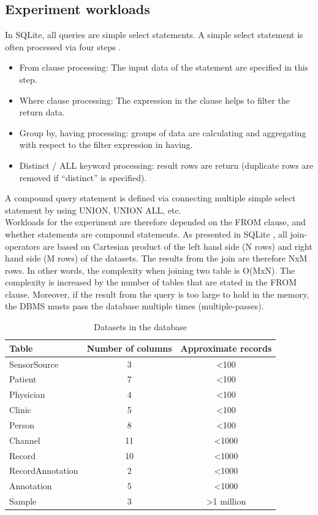 \subsection{Experiment workloads}
In SQLite, all queries are simple select statements. A simple select statement is often processed via four steps \citep{SQLITE_SELECT}.
\begin{itemize}
\item From clause processing: The input data of the statement are specified in this step.
\item Where clause processing: The expression in the clause helps to filter the return data.
\item Group by, having processing: groups of data are calculating and aggregating with respect to the filter expression in having.
\item Distinct / ALL keyword processing: result rows are return (duplicate rows are removed if “distinct” is specified).
\end{itemize}
A compound query statement is defined via connecting multiple simple select statement by using UNION, UNION ALL, etc.\\
Workloads for the experiment are therefore depended on the FROM clause, and whether statements are compound statements. As presented in SQLite \citep{SQLITE_SELECT}, all join-operators are based on Cartesian product of the left hand side (N rows) and right hand side (M rows) of the datasets. The results from the join are therefore NxM rows. In other words, the complexity when joining two table is O(MxN). The complexity is increased by the number of tables that are stated in the FROM clause. Moreover, if the result from the query is too large to hold in the memory, the DBMS musts pass the database multiple times (multiple-passes).\\
\begin{table}
\centering
\begin{tabular}{|l|c|c|}
\hline
\cellcolor[HTML]{00D2CB}Table & \cellcolor[HTML]{00D2CB}Number of columns & \cellcolor[HTML]{00D2CB}Approximate records \\ \hline
\cellcolor[HTML]{00D2CB}SensorSource & 3 & \textless100 \\ \hline
\cellcolor[HTML]{00D2CB}Patient & 7 & \textless100 \\ \hline
\cellcolor[HTML]{00D2CB}Physician & 4 & \textless100 \\ \hline
\cellcolor[HTML]{00D2CB}Clinic & 5 & \textless100 \\ \hline
\cellcolor[HTML]{00D2CB}Person & 8 & \textless100 \\ \hline
\cellcolor[HTML]{00D2CB}Channel & 11 & \textless1000 \\ \hline
\cellcolor[HTML]{00D2CB}Record & 10 & \textless1000 \\ \hline
\cellcolor[HTML]{00D2CB}RecordAnnotation & 2 & \textless1000 \\ \hline
\cellcolor[HTML]{00D2CB}Annotation & 5 & \textless1000 \\ \hline
\cellcolor[HTML]{00D2CB}Sample & 3 & \textgreater 1 million \\ \hline
\end{tabular}
\caption{Datasets in the database}
\label{tab:dataSETs}
\end{table}

